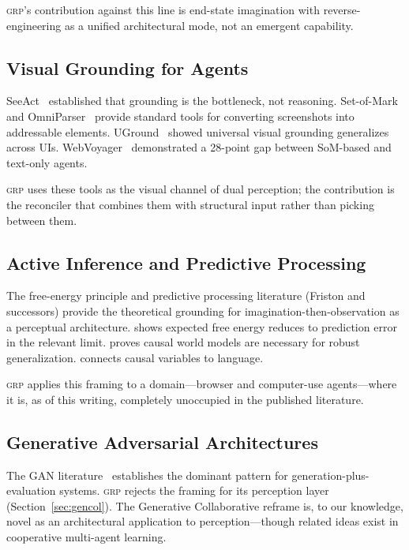 \documentclass[12pt]{article}
\theoremstyle{definition}
\theoremstyle{remark}
\newcommand{\grp}{\textsc{grp}}
\begin{document}
\grp{}'s contribution against this line is end-state imagination with
reverse-engineering as a unified architectural mode, not an emergent
capability.

\subsection{Visual Grounding for Agents}
SeeAct~\cite{seeact} established that grounding is the bottleneck,
not reasoning.
Set-of-Mark~\cite{som} and OmniParser~\cite{omniparser} provide
standard tools for converting screenshots into addressable elements.
UGround~\cite{uground} showed universal visual grounding generalizes
across UIs.
WebVoyager~\cite{webvoyager} demonstrated a 28-point gap between
SoM-based and text-only agents.

\grp{} uses these tools as the visual channel of dual perception; the
contribution is the reconciler that combines them with structural
input rather than picking between them.

\subsection{Active Inference and Predictive Processing}
The free-energy principle and predictive processing literature
(Friston and successors) provide the theoretical grounding for
imagination-then-observation as a perceptual architecture.
\cite{efe2025} shows expected free energy reduces to prediction error
in the relevant limit.
\cite{causal2024} proves causal world models are necessary for
robust generalization.
\cite{causalang2024} connects causal variables to language.

\grp{} applies this framing to a domain---browser and computer-use
agents---where it is, as of this writing, completely unoccupied in
the published literature.

\subsection{Generative Adversarial Architectures}
The GAN literature~\cite{gan2014} establishes the dominant pattern
for generation-plus-evaluation systems. \grp{} rejects the framing
for its perception layer (Section~\ref{sec:gencol}). The Generative
Collaborative reframe is, to our knowledge, novel as an architectural
application to perception---though related ideas exist in cooperative
multi-agent learning.

\end{document}
